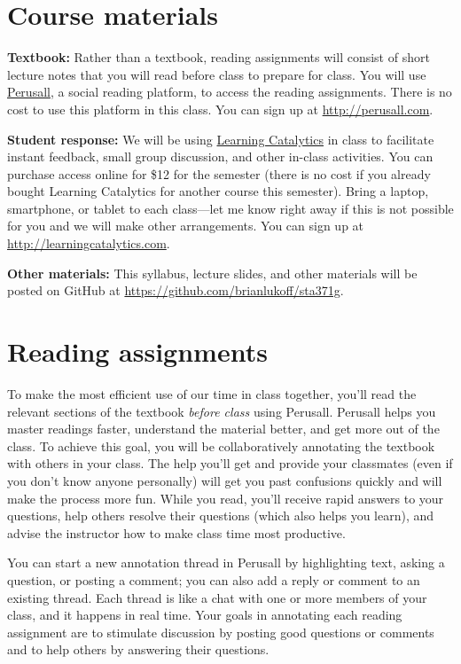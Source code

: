 \documentclass[12pt]{article}
\begin{document}
\section*{Course materials}

\textbf{Textbook:} Rather than a textbook, reading assignments will consist of short lecture notes that you will read before class to prepare for class.  You will use \href{http://perusall.com}{Perusall}, a social reading platform, to access the reading assignments. There is no cost to use this platform in this class. You can sign up at \url{http://perusall.com}.

\textbf{Student response:} We will be using \href{http://learningcatalytics.com}{Learning Catalytics} in class to facilitate instant feedback, small group discussion, and other in-class activities.  You can purchase access online for \$12 for the semester (there is no cost if you already bought Learning Catalytics for another course this semester).  Bring a laptop, smartphone, or tablet to each class---let me know right away if this is not possible for you and we will make other arrangements. You can sign up at \url{http://learningcatalytics.com}.

\textbf{Other materials:} This syllabus, lecture slides, and other materials will be posted on GitHub at \url{https://github.com/brianlukoff/sta371g}.

\section*{Reading assignments}

To make the most efficient use of our time in class together, you'll read the relevant sections of the textbook \emph{before class} using Perusall. 
Perusall helps you master readings faster, understand the material better, and get more out of the class. To achieve this goal, you will be collaboratively annotating the textbook with others in your class. The help you'll get and provide your classmates (even if you don't know anyone personally) will get you past confusions quickly and will make the process more fun. While you read, you'll receive rapid answers to your questions, help others resolve their questions (which also helps you learn), and advise the instructor how to make class time most productive. 

You can start a new annotation thread in Perusall by highlighting text, asking a question, or posting a comment; you can also add a reply or comment to an existing thread. Each thread is like a chat with one or more members of your class, and it happens in real time. Your goals in annotating each reading assignment are to stimulate discussion by posting good questions or comments and to help others by answering their questions.
\end{document}
